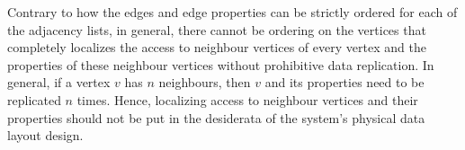 \begin{guideline}
	\label{gdln:vertices-unordered}
	\vspace{-5pt}
	Contrary to how the edges and edge properties can be strictly ordered for each of the adjacency lists, in general, there cannot be ordering on the vertices that completely localizes the access to neighbour vertices of every vertex and the properties of these neighbour vertices without prohibitive data replication. In general, if a vertex $v$ has $n$ neighbours, then $v$ and its properties need to be replicated $n$ times. Hence, localizing access to neighbour vertices and their properties should not be put in the desiderata of the system's physical data layout design.
	
\end{guideline}

